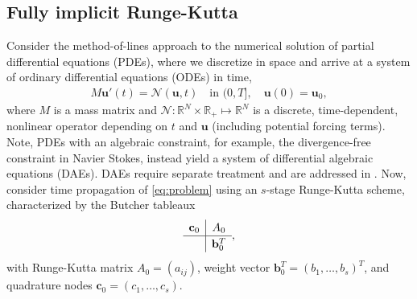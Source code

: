 \documentclass[review]{siamart}
\begin{document}
\subsection{Fully implicit Runge-Kutta}\label{sec:intro:irk}

Consider the method-of-lines approach to the numerical solution of partial differential
equations (PDEs), where we discretize in space and arrive at a system of ordinary
differential equations (ODEs) in time,
%
\begin{align}\label{eq:problem}
	M\mathbf{u}'(t) =  \mathcal{N}(\mathbf{u},t) \quad\text{in }(0,T], \quad \mathbf{u}(0) = \mathbf{u}_0,
\end{align}
%
where $M$ is a mass matrix and $\mathcal{N}:\mathbb{R}^{N} \times \mathbb{R}_+
\mapsto\mathbb{R}^{N}$ is a discrete, time-dependent, nonlinear operator
depending on $t$ and $\mathbf{u}$ (including potential forcing terms). Note,
PDEs with an algebraic constraint, for example, the divergence-free constraint
in Navier Stokes, instead yield a system of differential algebraic equations
(DAEs). DAEs require separate treatment and are addressed in .
Now, consider time propagation of \eqref{eq:problem} using an $s$-stage
Runge-Kutta scheme, characterized by the Butcher tableaux
%
\begin{align*}
	\renewcommand\arraystretch{1.2}
	\begin{array}
	{c|c}
	\mathbf{c}_0 & A_0\\
	\hline
	& \mathbf{b}_0^T
	\end{array},
\end{align*}
%
with Runge-Kutta matrix $A_0 = (a_{ij})$, weight vector $\mathbf{b}_0^T = (b_1, \ldots, b_s)^T$,
and quadrature nodes $\mathbf{c}_0 = (c_1, \ldots, c_s)$.
\end{document}
